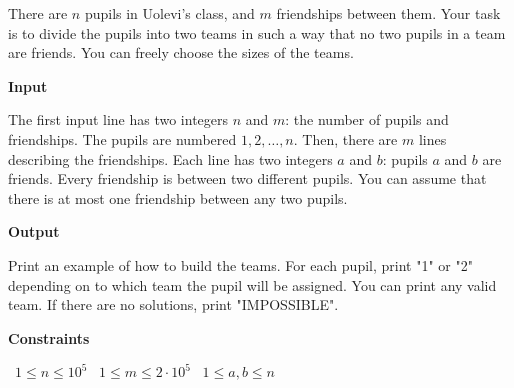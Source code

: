 There are $n$ pupils in Uolevi's class, and $m$ friendships between them. Your task is to divide the pupils into two teams in such a way that no two pupils in a team are friends. You can freely choose the sizes of the teams.

\vspace{0.3cm}\noindent\textbf{Input}

The first input line has two integers $n$ and $m$: the number of pupils and friendships. The pupils are numbered $1,2,\dots,n$.
Then, there are $m$ lines describing the friendships. Each line has two integers $a$ and $b$: pupils $a$ and $b$ are friends.
Every friendship is between two different pupils. You can assume that there is at most one friendship between any two pupils.

\vspace{0.3cm}\noindent\textbf{Output}

Print an example of how to build the teams. For each pupil, print "1" or "2" depending on to which team the pupil will be assigned. You can print any valid team.
If there are no solutions, print "IMPOSSIBLE".

\vspace{0.3cm}\noindent\textbf{Constraints}

\textbullet\ $1 \le n \le 10^5$
\textbullet\ $1 \le m \le 2 \cdot 10^5$
\textbullet\ $1 \le a,b \le n$